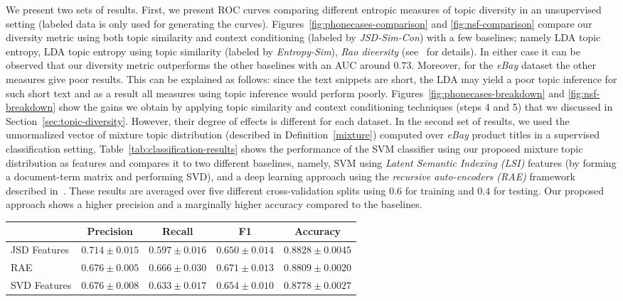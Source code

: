 \documentclass{article}
\begin{document}
We present two sets of results. First, we present
ROC curves comparing different entropic measures of topic diversity in an unsupervised setting 
(labeled data is only used for generating the curves). Figures~\ref{fig:phonecases-comparison} and \ref{fig:nsf-comparison}
compare our diversity metric using both topic similarity and context
conditioning (labeled by {\em JSD-Sim-Con}) with a few baselines;
namely LDA topic entropy, LDA topic entropy using topic similarity
(labeled by {\em Entropy-Sim}), {\em Rao diversity}
(see~\cite{bache:2013} for details). In either case it can be observed
that our diversity metric outperforms the other baselines with an AUC
around $0.73$. Moreover, for the {\em eBay} dataset the other measures
give poor results. This can be explained as follows: since the
text snippets are short, the LDA may yield a poor topic inference for such short text and as a result all measures using topic inference would perform poorly. Figures~\ref{fig:phonecases-breakdown} and \ref{fig:nsf-breakdown} show the gains we obtain by applying topic similarity and context conditioning techniques (steps 4 and 5) that we discussed in Section~\ref{sec:topic-diversity}. However, their degree of effects is different for each
dataset.  In the second set of results, we used the unnormalized vector of mixture topic
distribution (described in Definition~\ref{mixture}) computed over
{\em eBay} product titles in a supervised classification
setting. Table~\ref{tab:classification-results} shows
the performance of the SVM classifier using our proposed mixture topic
distribution as features and compares it to two different baselines, namely, SVM using
{\em Latent Semantic Indexing (LSI)} features (by forming a
document-term matrix and performing SVD), and a deep learning approach
using the {\em recursive auto-encoders (RAE)} framework described
in~\cite{Socher:2011:SRA:2145432.2145450}. These results are averaged
over five different cross-validation splits using $0.6$ for training
and $0.4$ for testing. Our proposed approach shows a higher precision
and a marginally higher accuracy compared to the baselines.




\begin{table*}[t]
\label{tab:classification-results}
\vspace{-4mm}
\begin{center}
\begin{tabular}{|l|c|c|c|c|}
\hline
&Precision & Recall & F1 & Accuracy
\\ \hline 
JSD Features         &$\mathbf{0.714}\pm 0.015$&$0.597\pm 0.016$&$0.650\pm
0.014$& $\mathbf{0.8828}\pm 0.0045$\\
RAE             &$0.676\pm 0.005$&$\mathbf{0.666}\pm 0.030$&$\mathbf{0.671}\pm
0.013$&$0.8809\pm 0.0020$ \\
SVD Features             &$0.676\pm 0.008$&$0.633\pm 0.017$&$0.654\pm
0.010$&$0.8778\pm 0.0027$\\
\hline
\end{tabular}
\caption{Classification results for the eBay dataset.}
\end{center}
\end{table*}
\end{document}
